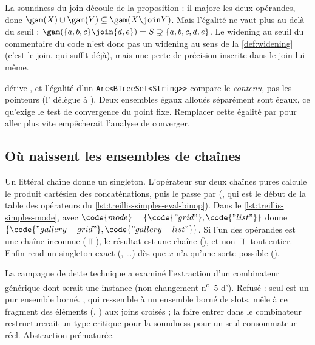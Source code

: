 La soundness du join découle de la proposition : il majore les deux
opérandes, donc $\gam(X) \cup \gam(Y) \subseteq \gam(X \join Y)$. Mais
l'égalité ne vaut plus au-delà du seuil :
$\gam(\{a,b,c\} \join \{d,e\}) = S \supsetneq \{a,b,c,d,e\}$. Le
\og widening au seuil\fg{} du commentaire du code n'est donc pas un widening
au sens de la \cref{def:widening} (c'est le join, qui suffit déjà), mais une
perte de précision inscrite dans le join lui-même.

\begin{piege}
   dérive , et l'égalité d'un
  \texttt{Arc<BTreeSet<String>{}>} compare le \emph{contenu}, pas les pointeurs
  (l' délègue à ). Deux ensembles
  égaux alloués séparément sont égaux, ce qu'exige le test de convergence du
  point fixe. Remplacer cette égalité par 
  \og pour aller plus vite\fg{} empêcherait l'analyse de converger.
\end{piege}

\subsection{Où naissent les ensembles de chaînes}

Un littéral chaîne donne un singleton. L'opérateur \code{+} sur deux chaînes
pures calcule le produit cartésien des concaténations, puis le passe par
 (, qui
est le début de la table des opérateurs du
\cref{lst:treillis-simples-eval-binop}). Dans le
\cref{lst:treillis-simples-mode},  avec
$\code{mode} = \{\code{"grid"}, \code{"list"}\}$ donne
$\{\code{"gallery-grid"}, \code{"gallery-list"}\}$. Si l'un des opérandes
est une chaîne inconnue ($\Top$), le résultat est \og une chaîne\fg{}
(), et non $\Top$ tout entier. Enfin
 rend un singleton exact (,
\dots) dès que $x$ n'a qu'une sorte possible
().

\begin{decision}
  La campagne de dette technique a examiné l'extraction d'un combinateur
  générique  dont  serait une
  instance (non-changement n\textsuperscript{o}~5 d'). Refusé : seul
   est un pur ensemble borné. , qui ressemble à
  un ensemble borné de slots, mêle à ce fragment des éléments
  (, ) aux joins croisés ; la faire entrer dans
  le combinateur restructurerait un type critique pour la soundness pour un
  seul consommateur réel. Abstraction prématurée.
\end{decision}

